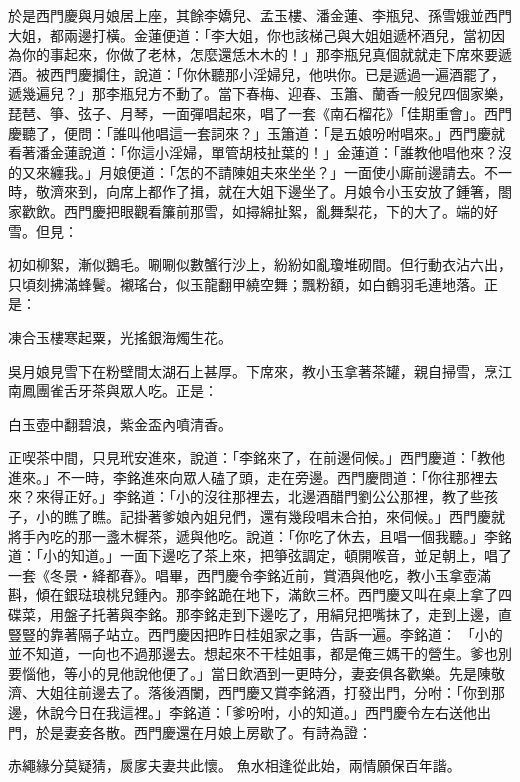 於是西門慶與月娘居上座，其餘李嬌兒、孟玉樓、潘金蓮、李瓶兒、孫雪娥並西門大姐，都兩邊打橫。金蓮便道：「李大姐，你也該梯己與大姐姐遞杯酒兒，當初因為你的事起來，你做了老林，怎麼還恁木木的！」那李瓶兒真個就就走下席來要遞酒。被西門慶攔住，說道：「你休聽那小淫婦兒，他哄你。已是遞過一遍酒罷了，遞幾遍兒？」那李瓶兒方不動了。當下春梅、迎春、玉簫、蘭香一般兒四個家樂，琵琶、箏、弦子、月琴，一面彈唱起來，唱了一套《南石榴花》「佳期重會」。西門慶聽了，便問：「誰叫他唱這一套詞來？」玉簫道：「是五娘吩咐唱來。」西門慶就看著潘金蓮說道：「你這小淫婦，單管胡枝扯葉的！」金蓮道：「誰教他唱他來？沒的又來纏我。」月娘便道：「怎的不請陳姐夫來坐坐？」一面使小廝前邊請去。不一時，敬濟來到，向席上都作了揖，就在大姐下邊坐了。月娘令小玉安放了鍾箸，閤家歡飲。西門慶把眼觀看簾前那雪，如撏綿扯絮，亂舞梨花，下的大了。端的好雪。但見：

初如柳絮，漸似鵝毛。唰唰似數蟹行沙上，紛紛如亂瓊堆砌間。但行動衣沾六出，只頃刻拂滿蜂鬢。襯瑤台，似玉龍翻甲繞空舞；飄粉額，如白鶴羽毛連地落。正是：

凍合玉樓寒起粟，光搖銀海燭生花。

吳月娘見雪下在粉壁間太湖石上甚厚。下席來，教小玉拿著茶罐，親自掃雪，烹江南鳳團雀舌牙茶與眾人吃。正是：

白玉壺中翻碧浪，紫金盃內噴清香。

正喫茶中間，只見玳安進來，說道：「李銘來了，在前邊伺候。」西門慶道：「教他進來。」不一時，李銘進來向眾人磕了頭，走在旁邊。西門慶問道：「你往那裡去來？來得正好。」李銘道：「小的沒往那裡去，北邊酒醋門劉公公那裡，教了些孩子，小的瞧了瞧。記掛著爹娘內姐兒們，還有幾段唱未合拍，來伺候。」西門慶就將手內吃的那一盞木樨茶，遞與他吃。說道：「你吃了休去，且唱一個我聽。」李銘道：「小的知道。」一面下邊吃了茶上來，把箏弦調定，頓開喉音，並足朝上，唱了一套《冬景‧絳都春》。唱畢，西門慶令李銘近前，賞酒與他吃，教小玉拿壺滿斟，傾在銀琺琅桃兒鍾內。那李銘跪在地下，滿飲三杯。西門慶又叫在桌上拿了四碟菜，用盤子托著與李銘。那李銘走到下邊吃了，用絹兒把嘴抹了，走到上邊，直豎豎的靠著隔子站立。西門慶因把昨日桂姐家之事，告訴一遍。李銘道： 「小的並不知道，一向也不過那邊去。想起來不干桂姐事，都是俺三媽干的營生。爹也別要惱他，等小的見他說他便了。」當日飲酒到一更時分，妻妾俱各歡樂。先是陳敬濟、大姐往前邊去了。落後酒闌，西門慶又賞李銘酒，打發出門，分咐：「你到那邊，休說今日在我這裡。」李銘道：「爹吩咐，小的知道。」西門慶令左右送他出門，於是妻妾各散。西門慶還在月娘上房歇了。有詩為證：

赤繩緣分莫疑猜，扊扅夫妻共此懷。
魚水相逢從此始，兩情願保百年諧。

